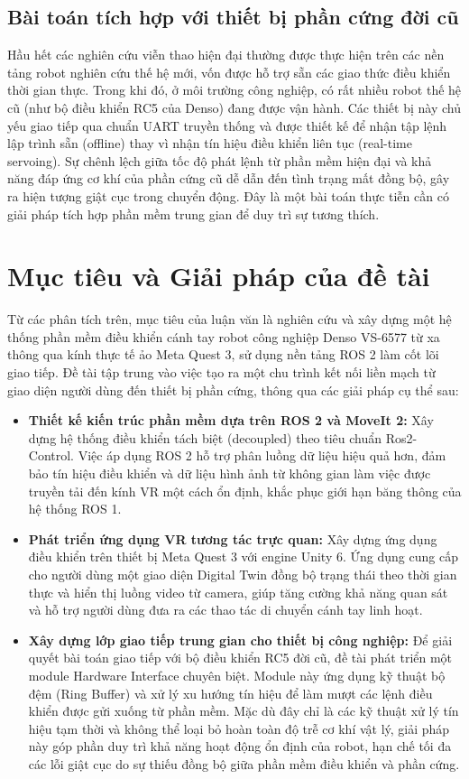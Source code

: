 \subsection{Bài toán tích hợp với thiết bị phần cứng đời cũ}
Hầu hết các nghiên cứu viễn thao hiện đại thường được thực hiện trên các nền tảng robot nghiên cứu thế hệ mới, vốn được hỗ trợ sẵn các giao thức điều khiển thời gian thực. Trong khi đó, ở môi trường công nghiệp, có rất nhiều robot thế hệ cũ (như bộ điều khiển RC5 của Denso) đang được vận hành. Các thiết bị này chủ yếu giao tiếp qua chuẩn UART truyền thống và được thiết kế để nhận tập lệnh lập trình sẵn (offline) thay vì nhận tín hiệu điều khiển liên tục (real-time servoing). Sự chênh lệch giữa tốc độ phát lệnh từ phần mềm hiện đại và khả năng đáp ứng cơ khí của phần cứng cũ dễ dẫn đến tình trạng mất đồng bộ, gây ra hiện tượng giật cục trong chuyển động. Đây là một bài toán thực tiễn cần có giải pháp tích hợp phần mềm trung gian để duy trì sự tương thích.

\section{Mục tiêu và Giải pháp của đề tài}
Từ các phân tích trên, mục tiêu của luận văn là nghiên cứu và xây dựng một hệ thống phần mềm điều khiển cánh tay robot công nghiệp Denso VS-6577 từ xa thông qua kính thực tế ảo Meta Quest 3, sử dụng nền tảng ROS 2 làm cốt lõi giao tiếp. Đề tài tập trung vào việc tạo ra một chu trình kết nối liền mạch từ giao diện người dùng đến thiết bị phần cứng, thông qua các giải pháp cụ thể sau:

\begin{itemize}
    \item \textbf{Thiết kế kiến trúc phần mềm dựa trên ROS 2 và MoveIt 2:} Xây dựng hệ thống điều khiển tách biệt (decoupled) theo tiêu chuẩn Ros2-Control. Việc áp dụng ROS 2 hỗ trợ phân luồng dữ liệu hiệu quả hơn, đảm bảo tín hiệu điều khiển và dữ liệu hình ảnh từ không gian làm việc được truyền tải đến kính VR một cách ổn định, khắc phục giới hạn băng thông của hệ thống ROS 1.
    \item \textbf{Phát triển ứng dụng VR tương tác trực quan:} Xây dựng ứng dụng điều khiển trên thiết bị Meta Quest 3 với engine Unity 6. Ứng dụng cung cấp cho người dùng một giao diện Digital Twin đồng bộ trạng thái theo thời gian thực và hiển thị luồng video từ camera, giúp tăng cường khả năng quan sát và hỗ trợ người dùng đưa ra các thao tác di chuyển cánh tay linh hoạt.
    \item \textbf{Xây dựng lớp giao tiếp trung gian cho thiết bị công nghiệp:} Để giải quyết bài toán giao tiếp với bộ điều khiển RC5 đời cũ, đề tài phát triển một module Hardware Interface chuyên biệt. Module này ứng dụng kỹ thuật bộ đệm (Ring Buffer) và xử lý xu hướng tín hiệu để làm mượt các lệnh điều khiển được gửi xuống từ phần mềm. Mặc dù đây chỉ là các kỹ thuật xử lý tín hiệu tạm thời và không thể loại bỏ hoàn toàn độ trễ cơ khí vật lý, giải pháp này góp phần duy trì khả năng hoạt động ổn định của robot, hạn chế tối đa các lỗi giật cục do sự thiếu đồng bộ giữa phần mềm điều khiển và phần cứng.
\end{itemize}

